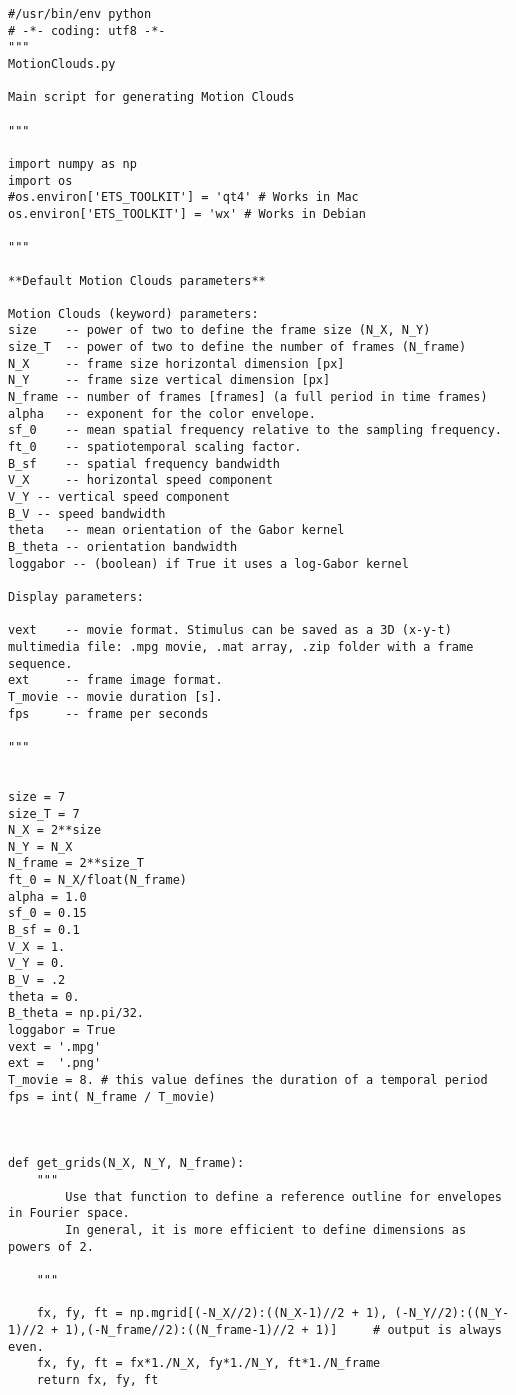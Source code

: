 \documentclass[a4paper,11pt]{article}%
\begin{document}
\begin{lstlisting}
#/usr/bin/env python
# -*- coding: utf8 -*-
"""
MotionClouds.py

Main script for generating Motion Clouds

"""

import numpy as np
import os
#os.environ['ETS_TOOLKIT'] = 'qt4' # Works in Mac
os.environ['ETS_TOOLKIT'] = 'wx' # Works in Debian

"""

**Default Motion Clouds parameters**

Motion Clouds (keyword) parameters:
size   	-- power of two to define the frame size (N_X, N_Y)
size_T 	-- power of two to define the number of frames (N_frame)
N_X 	-- frame size horizontal dimension [px]
N_Y 	-- frame size vertical dimension [px]
N_frame -- number of frames [frames] (a full period in time frames)
alpha 	-- exponent for the color envelope.
sf_0	-- mean spatial frequency relative to the sampling frequency.
ft_0 	-- spatiotemporal scaling factor. 
B_sf 	-- spatial frequency bandwidth
V_X 	-- horizontal speed component
V_Y	-- vertical speed component
B_V	-- speed bandwidth
theta	-- mean orientation of the Gabor kernel
B_theta -- orientation bandwidth
loggabor -- (boolean) if True it uses a log-Gabor kernel 

Display parameters:

vext   	-- movie format. Stimulus can be saved as a 3D (x-y-t) multimedia file: .mpg movie, .mat array, .zip folder with a frame sequence. 	
ext    	-- frame image format.
T_movie -- movie duration [s].
fps  	-- frame per seconds

"""


size = 7
size_T = 7
N_X = 2**size 
N_Y = N_X
N_frame = 2**size_T
ft_0 = N_X/float(N_frame)
alpha = 1.0 
sf_0 = 0.15 
B_sf = 0.1
V_X = 1.
V_Y = 0.
B_V = .2
theta = 0.
B_theta = np.pi/32.
loggabor = True
vext = '.mpg'
ext =  '.png'
T_movie = 8. # this value defines the duration of a temporal period
fps = int( N_frame / T_movie)



def get_grids(N_X, N_Y, N_frame):
    """
        Use that function to define a reference outline for envelopes in Fourier space.
        In general, it is more efficient to define dimensions as powers of 2.

    """
    
    fx, fy, ft = np.mgrid[(-N_X//2):((N_X-1)//2 + 1), (-N_Y//2):((N_Y-1)//2 + 1),(-N_frame//2):((N_frame-1)//2 + 1)]     # output is always even.
    fx, fy, ft = fx*1./N_X, fy*1./N_Y, ft*1./N_frame
    return fx, fy, ft


\end{lstlisting}
\end{document}
